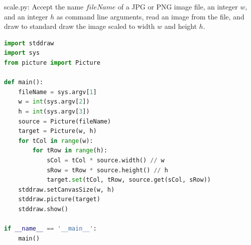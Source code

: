 \documentclass[8pt,a4paper,compress]{beamer}
\begin{document}
\begin{frame}[fragile]
\pause

\begin{framed}
\tiny scale.py: Accept the name $fileName$ of a JPG or PNG image file, an integer $w$, and an integer $h$ as command line arguments, read an image from the file, and draw to standard draw the image scaled to width $w$ and height $h$.
\end{framed}

\begin{lstlisting}[language=Python,style=focusin]
import stddraw
import sys
from picture import Picture

def main():
    fileName = sys.argv[1]
    w = int(sys.argv[2])
    h = int(sys.argv[3])
    source = Picture(fileName)
    target = Picture(w, h)
    for tCol in range(w):
        for tRow in range(h):
            sCol = tCol * source.width() // w
            sRow = tRow * source.height() // h
            target.set(tCol, tRow, source.get(sCol, sRow))
    stddraw.setCanvasSize(w, h)
    stddraw.picture(target)
    stddraw.show()

if __name__ == '__main__':
    main()
\end{lstlisting}
\end{frame}
\end{document}
